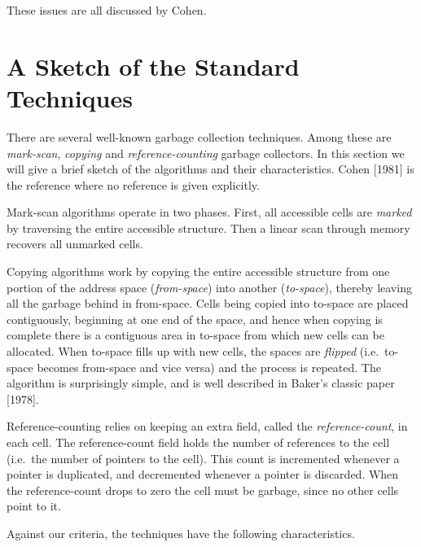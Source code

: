 \noindent
These issues are all discussed by Cohen.

\section{A Sketch of the Standard Techniques}

There are several well-known garbage collection techniques. Among these
are \textit{mark-scan}, \textit{copying} and \textit{reference-counting} garbage collectors. In this
section we will give a brief sketch of the algorithms and their characteristics.
Cohen [1981] is the reference where no reference is given explicitly.

Mark-scan algorithms operate in two phases. First, all accessible cells are
\textit{marked} by traversing the entire accessible structure. Then a linear scan
through memory recovers all unmarked cells.

Copying algorithms work by copying the entire accessible structure from
one portion of the address space (\textit{from-space}) into another (\textit{to-space}),
thereby leaving all the garbage behind in from-space. Cells being copied into
to-space are placed contiguously, beginning at one end of the space, and
hence when copying is complete there is a contiguous area in to-space from
which new cells can be allocated. When to-space fills up with new cells, the
spaces are \textit{flipped} (i.e.\ to-space becomes from-space and vice versa) and the
process is repeated. The algorithm is surprisingly simple, and is well described
in Baker's classic paper [1978].

Reference-counting relies on keeping an extra field, called the \textit{reference-count}, in each cell. The reference-count field holds the number of references
to the cell (i.e.\ the number of pointers to the cell). This count is incremented
whenever a pointer is duplicated, and decremented whenever a pointer is
discarded. When the reference-count drops to zero the cell must be garbage,
since no other cells point to it.

Against our criteria, the techniques have the following characteristics.

